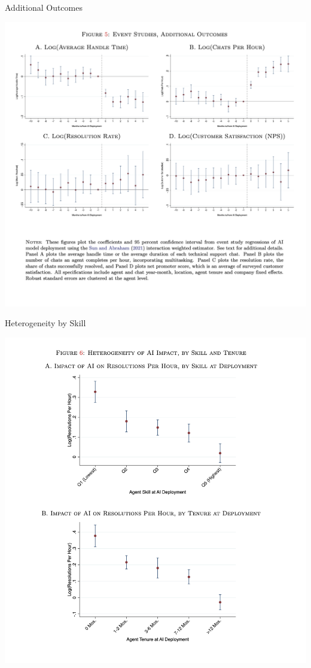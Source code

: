 \documentclass{beamer}
\begin{document}
\begin{frame}{Additional Outcomes}
\begin{center}
\includegraphics[scale=0.35]{./lecture_includes/brynn4}
\end{center}
\end{frame}

\begin{frame}{Heterogeneity by Skill}
\begin{center}
\includegraphics[scale=0.25]{./lecture_includes/brynn5}
\end{center}
\end{frame}
\end{document}
